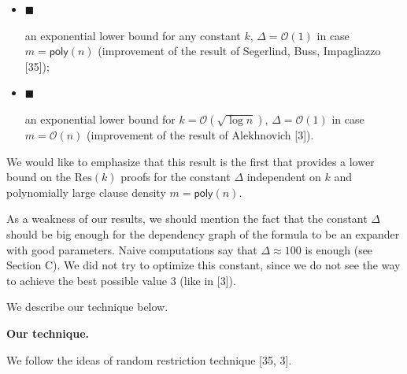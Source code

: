 \begin{itemize}


\item[] 
$\blacksquare$ 


an exponential lower bound for any constant $k$, $\Delta=\mathcal{O}\left(1\right)$ in case $m={\mathsf{poly}}(n)$
(improvement of the result of Segerlind, Buss, Impagliazzo [35]);\par





\item[] 
$\blacksquare$ 


an exponential lower bound for $k=\mathcal{O}\left(\sqrt{\log n}\right)$, $\Delta=\mathcal{O}\left(1\right)$ in case $m=\mathcal{O}\left(n\right)$ (improvement of the result of Alekhnovich [3]).\par





\end{itemize}




We would like to emphasize that this result is the first that provides a lower bound on the $\mathrm{Res}(k)$
proofs for the constant $\Delta$ independent on $k$ and polynomially large clause density $m={\mathsf{poly}}(n)$.\par




As a weakness of our results, we should mention the fact that the constant $\Delta$ should be big enough
for the dependency graph of the formula to be an expander with good parameters. Naive computations say
that $\Delta\approx 100$ is enough (see Section C). We did not try to optimize
this constant, since we do not see the way to achieve the best possible value $3$ (like in
[3]).\par




We describe our technique below.\par




\par\medskip\noindent\textbf{Our technique.}\par




We follow the ideas of random restriction technique
[35, 3].\par





